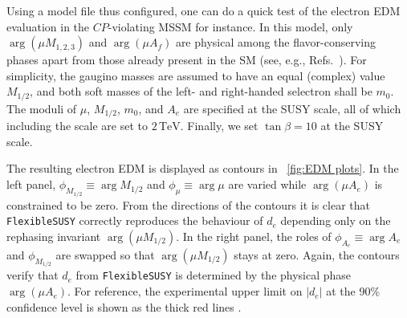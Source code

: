\documentclass[final,3p,11pt,pdflatex]{elsarticle}
\makeatletter
\newcommand{\fs}{\texttt{FlexibleSUSY}\@\xspace}
\newcommand{\unit}[1]{\,\text{#1}}      %
\newcommand{\edm}[1]{\ensuremath{d_{#1}}\xspace}
\newcommand{\figref}[1]{\figurename~\ref{#1}}
\newcommand{\CP}{\ensuremath{CP}\xspace}
\newcommand{\mhalf}{\ensuremath{M_{1/2}}\xspace}
\newcommand{\mzero}{\ensuremath{m_0}\xspace}
\makeatother
\begin{document}
Using a model file thus configured, one can do a quick test of
the electron EDM evaluation in the \CP-violating MSSM for instance.
In this model, only $\arg(\mu M_{1,2,3})$ and $\arg (\mu A_f)$ are
physical among the flavor-conserving phases
apart from those already present in the SM
(see, e.g., Refs.~\cite{Pokorski:1999hz,Stockinger:2006zn}).
For simplicity,
the gaugino masses are assumed to have an equal (complex) value
$\mhalf$, and both soft masses of the left- and right-handed
selectron shall be $\mzero$.
The moduli of $\mu$, $\mhalf$, $\mzero$, and $A_e$
are specified at the SUSY scale,
all of which including the scale are set to $2\unit{TeV}$.
Finally, we set $\tan\beta = 10$ at the SUSY scale.

The resulting electron EDM is displayed as contours in
\figref{fig:EDM plots}.
In the left panel, $\phi_{\mhalf} \equiv \arg \mhalf$ and
$\phi_\mu \equiv \arg \mu$ are varied
while $\arg(\mu A_e)$ is constrained to be zero.
From the directions of the contours it is clear
that \fs correctly reproduces the behaviour of
$\edm{e}$ depending only on the rephasing invariant $\arg(\mu \mhalf)$.
In the right panel, the roles of $\phi_{A_e} \equiv \arg A_e$ and
$\phi_{\mhalf}$ are swapped so that $\arg(\mu \mhalf)$ stays at zero.
Again, the contours verify that
$\edm{e}$ from \fs is determined by the physical phase $\arg(\mu A_e)$.
For reference,
the experimental upper limit on $|\edm{e}|$ at the 90\% confidence level
is shown as the thick red lines \cite{Baron:2013eja}.
\end{document}
